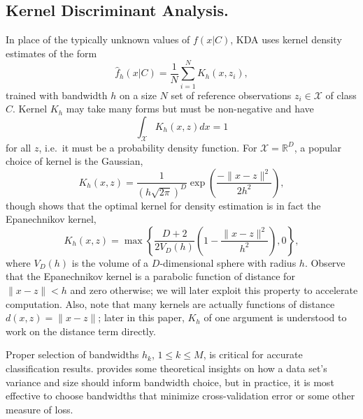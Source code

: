 \documentclass[twoside,leqno,twocolumn]{article}
\begin{document}
\subsection{Kernel Discriminant Analysis.}
In place of the typically unknown values of $f(x|C)$, KDA uses kernel
density estimates of the form
\begin{equation}
  \widehat{f}_h(x|C) = \frac{1}{N} \sum_{i=1}^N K_h(x,z_i) ,
\end{equation}
trained with bandwidth $h$ on a size $N$ set of reference observations
$z_i \in \mathcal{X}$ of class $C$.  Kernel $K_h$ may take many forms
but must be non-negative and have
\begin{equation}
  \int_{\mathcal{X}} K_h(x,z) dx = 1
\end{equation}
for all $z$, i.e.~it must be a probability density function.  For
$\mathcal{X} = \mathbb{R}^D$, a popular choice of kernel is the
Gaussian,
\begin{equation}
  K_h(x,z) = \frac{1}{\left( h \sqrt{2 \pi} \right)^D} \exp \! \left( \frac{- \| x - z \|^2}{2 h^2} \right) ,
\end{equation}
though \cite{silverman86} shows that the optimal kernel for density
estimation is in fact the Epanechnikov kernel,
\begin{equation}
  K_h(x,z) = \max \left\{ \frac{D + 2}{2 V_D(h)} \left( 1 - \frac{\| x - z \|^2}{h^2} \right), 0 \right\} ,
\end{equation}
where $V_D(h)$ is the volume of a $D$-dimensional sphere with radius
$h$.  Observe that the Epanechnikov kernel is a parabolic function of
distance for $\| x - z \| < h$ and zero otherwise; we will later
exploit this property to accelerate computation.  Also, note that many
kernels are actually functions of distance $d(x,z) = \| x - z \|$;
later in this paper, $K_h$ of one argument is understood to work on
the distance term directly.

Proper selection of bandwidths $h_k$, $1 \leq k \leq M$, is critical
for accurate classification results.  \cite{silverman86} provides some
theoretical insights on how a data set's variance and size should
inform bandwidth choice, but in practice, it is most effective to
choose bandwidths that minimize cross-validation error or some other
measure of loss.
\end{document}

